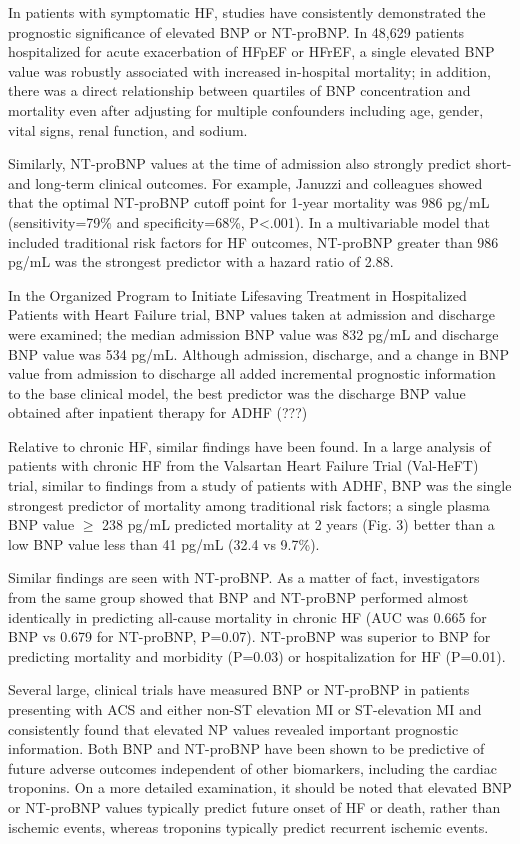 \documentclass[14pt,a4paper,onecolumn]{extarticle}
\begin{document}
In patients with symptomatic HF, studies have consistently demonstrated the prognostic significance of elevated BNP or NT-proBNP. In 48,629 patients hospitalized for acute exacerbation of HFpEF or HFrEF, a single elevated BNP value was robustly associated with increased in-hospital mortality; in addition, there was a direct relationship between quartiles of BNP concentration and mortality even after adjusting for multiple confounders including age, gender, vital signs, renal function, and sodium. \citep{Fonarow2007}

Similarly, NT-proBNP values at the time of admission also strongly predict short- and long-term clinical outcomes. For example, Januzzi and colleagues showed that the optimal NT-proBNP cutoff point for 1-year mortality was 986 pg/mL (sensitivity=79\% and specificity=68\%, P<.001). In a multivariable model that included traditional risk factors for HF outcomes, NT-proBNP greater than 986 pg/mL was the strongest predictor with a hazard ratio of 2.88. \citep{Januzzi2006b}

In the Organized Program to Initiate Lifesaving Treatment in Hospitalized Patients with Heart Failure trial, BNP values taken at admission and discharge were examined; the median admission BNP value was 832 pg/mL and discharge BNP value was 534 pg/mL. Although admission, discharge, and a change in BNP value from admission to discharge all added incremental prognostic information to the base clinical model, the best predictor was the discharge BNP value obtained after inpatient therapy for ADHF (???)

Relative to chronic HF, similar findings have been found. In a large analysis of patients with chronic HF from the Valsartan Heart Failure Trial (Val-HeFT) trial, similar to findings from a study of patients with ADHF, BNP was the single strongest predictor of mortality among traditional risk factors; a single plasma BNP value $\geq$ 238 pg/mL predicted mortality at 2 years (Fig. 3) better than a low BNP value less than 41 pg/mL (32.4 vs 9.7\%). \citep{Anand2003}

Similar findings are seen with NT-proBNP. As a matter of fact, investigators from the same group showed that BNP and NT-proBNP performed almost identically in predicting all-cause mortality in chronic HF (AUC was 0.665 for BNP vs 0.679 for NT-proBNP, P=0.07). NT-proBNP was superior to BNP for predicting mortality and morbidity (P=0.03) or hospitalization for HF (P=0.01). \citep{Masson2006}

Several large, clinical trials have measured BNP or NT-proBNP in patients presenting with ACS and either non-ST elevation MI or ST-elevation MI and consistently found that elevated NP values revealed important prognostic information. Both BNP and NT-proBNP have been shown to be predictive of future adverse outcomes independent of other biomarkers, including the cardiac troponins. On a more detailed examination, it should be noted that elevated BNP or NT-proBNP values typically predict future onset of HF or death, rather than ischemic events, whereas troponins typically predict recurrent ischemic events. \citep{Gaggin2014}
\end{document}
